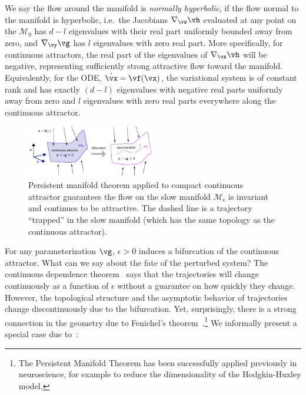 \documentclass{article} %
\newcounter{ct}
\newcommand{\manifold}{\mathcal{M}}
\theoremstyle{definition}
\theoremstyle{remark}
\begin{document}
We say the flow around the manifold is \emph{normally hyperbolic}, if the flow normal to the manifold is hyperbolic, i.e.\ the Jacobians \(\nabla_{\vz} \vh\) evaluated at any point on the \(\manifold_{0}\) has \(d - l\) eigenvalues with their real part uniformly bounded away from zero, and \(\nabla_{\vy} \vg\) has \(l\) eigenvalues with zero real part.
More specifically, for continuous attractors, the real part of the eigenvalues of \(\nabla_{\vz} \vh\) will be negative, representing sufficiently strong attractive flow toward the manifold.
Equivalently, for the ODE, \(\dot{\vx} = \vf(\vx)\), the variational system is of constant rank and has exactly \((d - l)\) eigenvalues with negative real parts uniformly away from zero and \(l\) eigenvalues with zero real parts everywhere along the continuous attractor.



\setlength\belowcaptionskip{-5ex}
\begin{figure}
  \centering
  \includegraphics[width=0.5\textwidth]{FenichelThm}
  \caption{
    Persistent manifold theorem applied to compact continuous attractor guarantees the flow on the slow manifold \(\manifold_{\epsilon}\) is invariant and continues to be attractive.
    The dashed line is a trajectory ``trapped'' in the slow manifold (which has the same topology as the continuous attractor). %
  }\label{fig:fenichel}
\end{figure}

For any parameterization \(\vg\), \(\epsilon > 0\) induces a bifurcation of the continuous attractor.
What can we say about the fate of the perturbed system?
The continuous dependence theorem~\citep{Chicone2006} says that the trajectories will change continuously as a function of \(\epsilon\) without a guarantee on how quickly they change.
However, the topological structure and the asymptotic behavior of trajectories change discontinuously due to the bifurcation.
Yet, surprisingly, there is a strong connection in the geometry due to Fenichel's theorem~\cite{fenichel1971}.\footnote{The Persistent Manifold Theorem has been successfully applied previously in neuroscience\citep{Kopell1996,ermentrout2010}, for example to reduce the dimensionality of the Hodgkin-Huxley model\citep{rinzel1985excitation,ermentrout1986parabolic}.}
We informally present a special case due to~\citet{Jones1995}:
\end{document}
